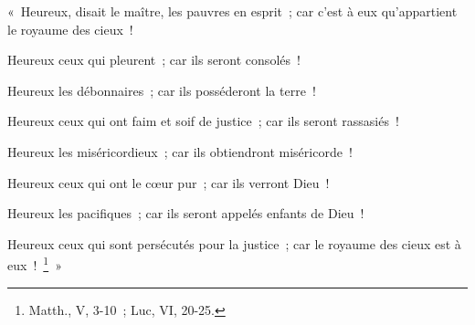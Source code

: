 \documentclass[french,twoside]{book} %
\newenvironment{quoteblock}%
  {\begin{quoting}}
  {\end{quoting}}
\newenvironment{quotebar}{%
    \def\FrameCommand{{\color{rubric!10!}\vrule width 0.5em} \hspace{0.9em}}%
    \def\OuterFrameSep{\itemsep} %
    \MakeFramed {\advance\hsize-\width \FrameRestore}
  }%
  {%
    \endMakeFramed
  }
\renewenvironment{quoteblock}%
  {%
    \savenotes
    \setstretch{0.9}
    \normalfont
    \begin{quotebar}
  }
  {%
    \end{quotebar}
    \spewnotes
  }
\begin{document}
\begin{quoteblock}
 \noindent « Heureux, disait le maître, les pauvres en esprit ; car c’est à eux qu’appartient le royaume des cieux !\par
 Heureux ceux qui pleurent ; car ils seront consolés !\par
 Heureux les débonnaires ; car ils posséderont la terre !\par
 Heureux ceux qui ont faim et soif de justice ; car ils seront rassasiés !\par
 Heureux les miséricordieux ; car ils obtiendront miséricorde !\par
 Heureux ceux qui ont le cœur pur ; car ils verront Dieu !\par
 Heureux les pacifiques ; car ils seront appelés enfants de Dieu !\par
 Heureux ceux qui sont persécutés pour la justice ; car le royaume des cieux est à eux ! \footnote{Matth., V, 3-10 ; Luc, VI, 20-25.} »
 \end{quoteblock}
\end{document}
